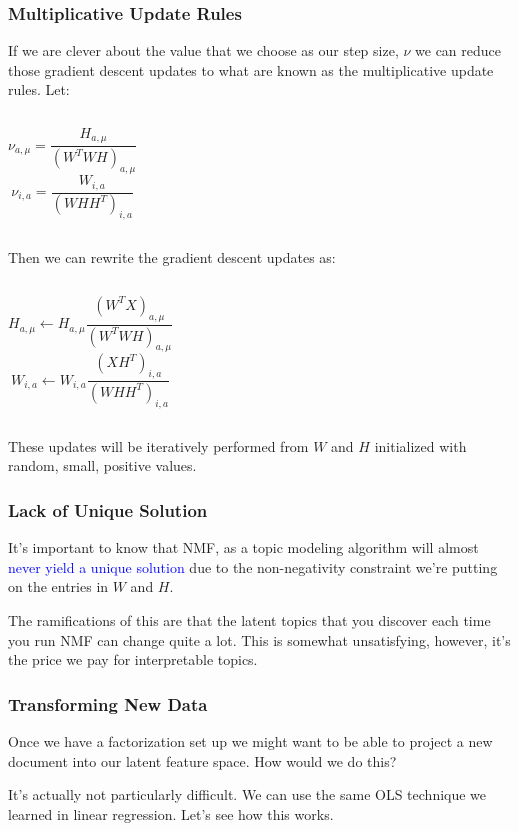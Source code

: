 \documentclass{beamer}
\begin{document}
\begin{frame}
  \frametitle{Multiplicative Update Rules}
  If we are clever about the value that we choose as our step size, $\nu$ we can reduce those gradient descent updates to what are known as the multiplicative update rules. \vspace{2mm}
  Let: \vspace{1mm}

  \begin{columns}
      $$ \nu_{a, \mu} = \frac{H_{a, \mu}}{(W^T WH)_{a, \mu}} $$
      $$ \nu_{i, a} = \frac{W_{i, a}}{(WHH^T)_{i, a}} $$
  \end{columns} \vspace{4mm}

  Then we can rewrite the gradient descent updates as: \vspace{0.5mm}

  \begin{columns}
      $$ H_{a, \mu} \leftarrow H_{a, \mu} \frac{(W^T X)_{a, \mu}}{(W^T WH)_{a, \mu}} $$
      $$ W_{i, a} \leftarrow W_{i, a} \frac{(XH^T)_{i, a}}{(WHH^T)_{i, a}} $$
  \end{columns} \vspace{4mm}

  These updates will be iteratively performed from $W$ and $H$ initialized with random, small, positive values.
\end{frame}

\begin{frame}
  \frametitle{Lack of Unique Solution}
  It's important to know that NMF, as a topic modeling algorithm will almost \textcolor{blue}{never yield a unique solution} due to the non-negativity constraint we're putting on the entries in $W$ and $H$. \vspace{4mm}

  The ramifications of this are that the latent topics that you discover each time you run NMF can change quite a lot. This is somewhat unsatisfying, however, it's the price we pay for interpretable topics.
\end{frame}

\begin{frame}
  \frametitle{Transforming New Data}
  Once we have a factorization set up we might want to be able to project a new document into our latent feature space. How would we do this? \vspace{4mm} \pause

  It's actually not particularly difficult. We can use the same OLS technique we learned in linear regression. Let's see how this works. \vspace{4mm}
\end{frame}
\end{document}
